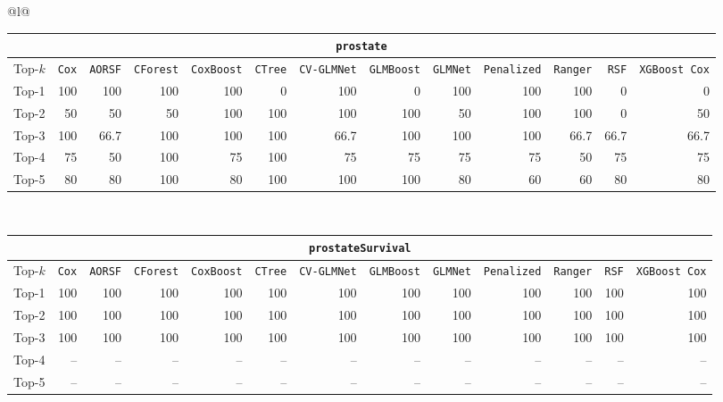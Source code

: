 \begin{longtable}{@{}l@{}}
\begin{tabular}{@{}l*{12}{r}@{}}
\multicolumn{13}{c}{\texttt{prostate}} \\
\midrule
Top-$k$ & \texttt{Cox} & \texttt{AORSF} & \texttt{CForest} & \texttt{CoxBoost} & \texttt{CTree} & \texttt{CV-GLMNet} & \texttt{GLMBoost} & \texttt{GLMNet} & \texttt{Penalized} & \texttt{Ranger} & \texttt{RSF} & \texttt{XGBoost Cox} \\
\midrule
Top-1 & 100 & 100 & 100 & 100 & 0 & 100 & 0 & 100 & 100 & 100 & 0 & 0 \\
Top-2 & 50 & 50 & 50 & 100 & 100 & 100 & 100 & 50 & 100 & 100 & 0 & 50 \\
Top-3 & 100 & 66.7 & 100 & 100 & 100 & 66.7 & 100 & 100 & 100 & 66.7 & 66.7 & 66.7 \\
Top-4 & 75 & 50 & 100 & 75 & 100 & 75 & 75 & 75 & 75 & 50 & 75 & 75 \\
Top-5 & 80 & 80 & 100 & 80 & 100 & 100 & 100 & 80 & 60 & 60 & 80 & 80 \\
\end{tabular} \\
\midrule

\begin{tabular}{@{}l*{12}{r}@{}}
\multicolumn{13}{c}{\texttt{prostateSurvival}} \\
\midrule
Top-$k$ & \texttt{Cox} & \texttt{AORSF} & \texttt{CForest} & \texttt{CoxBoost} & \texttt{CTree} & \texttt{CV-GLMNet} & \texttt{GLMBoost} & \texttt{GLMNet} & \texttt{Penalized} & \texttt{Ranger} & \texttt{RSF} & \texttt{XGBoost Cox} \\
\midrule
Top-1 & 100 & 100 & 100 & 100 & 100 & 100 & 100 & 100 & 100 & 100 & 100 & 100 \\
Top-2 & 100 & 100 & 100 & 100 & 100 & 100 & 100 & 100 & 100 & 100 & 100 & 100 \\
Top-3 & 100 & 100 & 100 & 100 & 100 & 100 & 100 & 100 & 100 & 100 & 100 & 100 \\
Top-4 & -- & -- & -- & -- & -- & -- & -- & -- & -- & -- & -- & -- \\
Top-5 & -- & -- & -- & -- & -- & -- & -- & -- & -- & -- & -- & -- \\
\end{tabular} \\
\midrule


\end{longtable}
